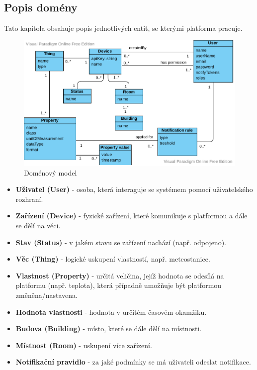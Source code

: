 \subsection{Popis domény}
Tato kapitola obsahuje popis jednotlivých entit, se kterými platforma pracuje.
\begin{figure}[htbp]
    \centering
    \includegraphics[width=\textwidth]{img/domain.pdf}
    \caption{  \label{domain-model}Doménový model}
\end{figure}
\begin{itemize}
    \item \textbf{Uživatel (User)} - osoba, která interaguje se systémem pomocí uživatelského rozhraní.
    \item \textbf{Zařízení (Device)} - fyzické zařízení, které komunikuje s platformou a dále se dělí na věci.
    \item \textbf{Stav (Status)} - v jakém stavu se zařízení nachází (např. odpojeno).
    \item \textbf{Věc (Thing)} - logické uskupení vlastností, např. meteostanice.
    \item \textbf{Vlastnost (Property)} - určitá veličina, jejíž hodnota se odesílá na platformu (např. teplota), která případně umožňuje být platformou změněna/nastavena.
    \item \textbf{Hodnota vlastnosti} - hodnota v určitém časovém okamžiku.
    \item \textbf{Budova (Building)} - místo, které se dále dělí na místnosti.
    \item \textbf{Místnost (Room)} - uskupení více zařízení.
    \item \textbf{Notifikační pravidlo} - za jaké podmínky se má uživateli odeslat notifikace.
\end{itemize}


